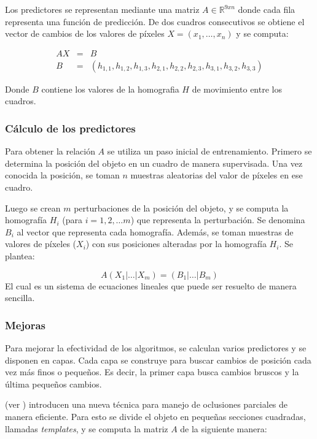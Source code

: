 \documentclass[a4paper,10pt]{article}
\begin{document}
Los predictores se representan mediante una matriz $A \in \mathbb{R}^{9xn}$
donde cada fila representa una función de predicción.  De dos cuadros
consecutivos se obtiene el vector de cambios de los valores de píxeles $X = (x_1,
\dots, x_n)$ y se computa:

\begin{eqnarray*}
    AX &=& B \\
    B &=& (h_{1,1}, h_{1,2}, h_{1,3}, h_{2,1}, h_{2,2}, h_{2,3}, h_{3,1}, h_{3,2}, h_{3,3})
\end{eqnarray*}

Donde $B$ contiene los valores de la homografia $H$ de movimiento entre los cuadros.

\subsubsection{Cálculo de los predictores}
Para obtener la relación $A$ se utiliza un paso inicial de entrenamiento.
Primero se determina la posición del objeto en un cuadro de manera supervisada.
Una vez conocida la posición, se toman $n$ muestras aleatorias del valor de
píxeles en ese cuadro.

Luego se crean $m$ perturbaciones de la posición del objeto, y se computa la
homografía $H_i$ (para $i = 1, 2, \dots m$) que representa la perturbación.
Se denomina $B_i$ al vector que representa cada homografía. Además, se toman
muestras de valores de píxeles ($X_i$) con sus posiciones alteradas por la
homografía $H_i$. Se plantea:

\begin{equation}
    A \left( X_1 \lvert \dots \lvert X_m \right) = \left( B_1 \lvert \dots \lvert B_m \right)
\end{equation}
El cual es un sistema de ecuaciones lineales que puede ser resuelto de manera sencilla.

\subsubsection{Mejoras}

Para mejorar la efectividad de los algoritmos, se calculan varios predictores y se disponen en capas.
Cada capa se construye para buscar cambios de posición cada vez más finos o pequeños.
Es decir, la primer capa busca cambios bruscos y la última pequeños cambios.

\citeauthor*{alp} (ver \cite{alp}) introducen una nueva técnica para manejo de oclusiones
parciales de manera eficiente. Para esto se divide el objeto en pequeñas
secciones cuadradas, llamadas \textit{templates}, y se computa la matriz $A$ de
la siguiente manera:
\end{document}
